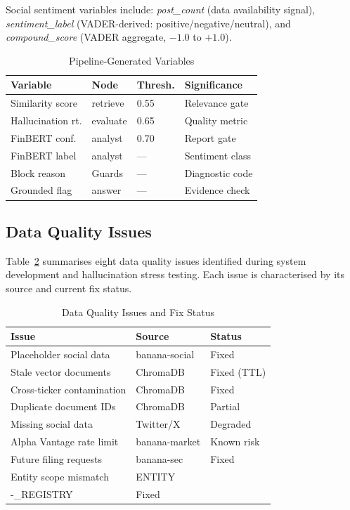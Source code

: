 \documentclass[10pt,twocolumn]{article}
\begin{document}
Social sentiment variables include: \textit{post\_count}
(data availability signal), \textit{sentiment\_label}
(VADER-derived: positive/negative/neutral), and
\textit{compound\_score} (VADER aggregate, $-1.0$ to $+1.0$).

\begin{table}[htbp]
\caption{Pipeline-Generated Variables}
\label{tab:pipevar}
\centering
\small
\begin{tabular}{@{}llll@{}}
\toprule
\textbf{Variable} & \textbf{Node} & \textbf{Thresh.} &
\textbf{Significance} \\
\midrule
Similarity score  & retrieve  & 0.55 & Relevance gate \\
Hallucination rt. & evaluate  & 0.65 & Quality metric \\
FinBERT conf.     & analyst   & 0.70 & Report gate \\
FinBERT label     & analyst   & ---  & Sentiment class \\
Block reason      & Guards    & ---  & Diagnostic code \\
Grounded flag     & answer    & ---  & Evidence check \\
\bottomrule
\end{tabular}
\end{table}

\subsection{Data Quality Issues}

Table~\ref{tab:dataqual} summarises eight data quality issues
identified during system development and hallucination stress testing.
Each issue is characterised by its source and current fix status.

\begin{table}[htbp]
\caption{Data Quality Issues and Fix Status}
\label{tab:dataqual}
\centering
\small
\begin{tabular}{@{}lll@{}}
\toprule
\textbf{Issue} & \textbf{Source} & \textbf{Status} \\
\midrule
Placeholder social data     & banana-social    & Fixed \\
Stale vector documents      & ChromaDB         & Fixed (TTL) \\
Cross-ticker contamination  & ChromaDB         & Fixed \\
Duplicate document IDs      & ChromaDB         & Partial \\
Missing social data         & Twitter/X        & Degraded \\
Alpha Vantage rate limit    & banana-market    & Known risk \\
Future filing requests      & banana-sec       & Fixed \\
Entity scope mismatch       & ENTITY\\-\_REGISTRY & Fixed \\
\bottomrule
\end{tabular}
\end{table}
\end{document}
